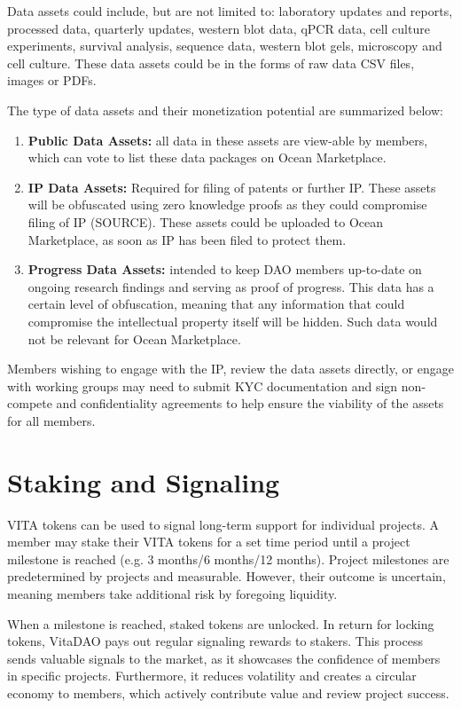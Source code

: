 \documentclass[12pt,letterpaper]{article}
\begin{document}
Data assets could include, but are not limited to: laboratory updates and reports, processed data, quarterly updates, western blot data, qPCR data, cell culture experiments, survival analysis, sequence data, western blot gels, microscopy and cell culture. These data assets could be in the forms of raw data CSV files, images or PDFs.

The type of data assets and their monetization potential are summarized below:
\begin{enumerate}
\item \textbf{Public Data Assets:} all data in these assets are view-able by members, which can vote to list these data packages on Ocean Marketplace.
\item \textbf{IP Data Assets:} Required for filing of patents or further IP. These assets will be obfuscated using zero knowledge proofs as they could compromise filing of IP (SOURCE). These assets could be uploaded to Ocean Marketplace, as soon as IP has been filed to protect them.
\item \textbf{Progress Data Assets:} intended to keep DAO members up-to-date on ongoing research findings and serving as proof of progress. This data has a certain level of obfuscation, meaning that any information that could compromise the intellectual property itself will be hidden. Such data would not be relevant for Ocean Marketplace.
\end{enumerate}
Members wishing to engage with the IP, review the data assets directly, or engage with working groups may need to submit KYC documentation and sign non-compete and confidentiality agreements to help ensure the viability of the assets for all members.

\section{Staking and Signaling}
VITA tokens can be used to signal long-term support for individual projects. A member may stake their VITA tokens for a set time period until a project milestone is reached (e.g. 3 months/6 months/12 months). Project milestones are predetermined by projects and measurable. However, their outcome is uncertain, meaning members take additional risk by foregoing liquidity.

When a milestone is reached, staked tokens are unlocked. In return for locking tokens, VitaDAO pays out regular signaling rewards to stakers. This process sends valuable signals to the market, as it showcases the confidence of members in specific projects. Furthermore, it reduces volatility and creates a circular economy to members, which actively contribute value and review project success.
\end{document}
